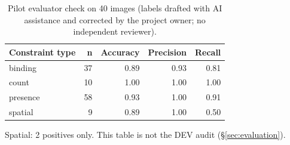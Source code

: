\begin{table}[t]
\centering\small
\caption{Pilot evaluator check on 40 images (labels drafted with AI assistance and corrected by the project owner; no independent reviewer).}
\label{tab:pilot-validation}
\begin{tabular}{lrrrr}
\toprule
Constraint type & n & Accuracy & Precision & Recall \\
\midrule
binding & 37 & 0.89 & 0.93 & 0.81 \\
count & 10 & 1.00 & 1.00 & 1.00 \\
presence & 58 & 0.93 & 1.00 & 0.91 \\
spatial & 9 & 0.89 & 1.00 & 0.50 \\
\bottomrule
\end{tabular}
\par\smallskip\footnotesize Spatial: 2 positives only. This table is not the DEV audit (\S\ref{sec:evaluation}).
\end{table}
